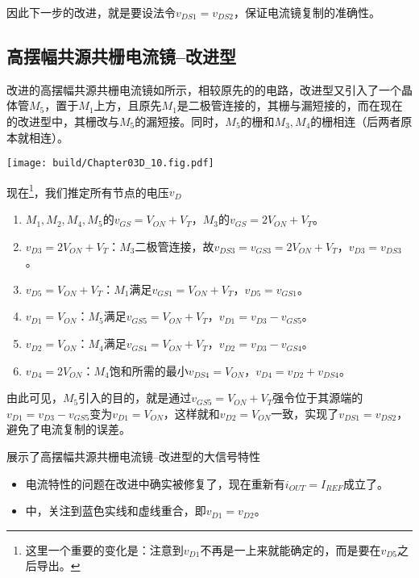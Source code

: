 因此下一步的改进，就是要设法令$v_{DS1}=v_{DS2}$，保证电流镜复制的准确性。\goodbreak

\subsection{高摆幅共源共栅电流镜--改进型}
改进的高摆幅共源共栅电流镜如所示，相较原先的的电路，改进型又引入了一个晶体管$M_5$，置于$M_1$上方，且原先$M_1$是二极管连接的，其栅与漏短接的，而在现在的改进型中，其栅改与$M_5$的漏短接。同时，$M_5$的栅和$M_3,M_4$的栅相连（后两者原本就相连）。\nopagebreak

\begin{Figure}
    \texttt{[image: build/Chapter03D\_10.fig.pdf]}
\end{Figure}

现在\footnote{这里一个重要的变化是：注意到$v_{D1}$不再是一上来就能确定的，而是要在$v_{D5}$之后导出。}，我们推定所有节点的电压$v_D$
\begin{enumerate}
    \item $M_1,M_2,M_4,M_5$的$v_{GS}=V_{ON}+V_T$，$M_3$的$v_{GS}=2V_{ON}+V_T$。
    \item $v_{D3}=2V_{ON}+V_T$：$M_3$二极管连接，故$v_{DS3}=v_{GS3}=2V_{ON}+V_T$，$v_{D3}=v_{DS3}$。
    \item $v_{D5}=V_{ON}+V_T$：$M_1$满足$v_{GS1}=V_{ON}+V_T$，$v_{D5}=v_{GS1}$。
    \item $v_{D1}=V_{ON}$：$M_5$满足$v_{GS5}=V_{ON}+V_T$，$v_{D1}=v_{D3}-v_{GS5}$。
    \item $v_{D2}=V_{ON}$：$M_4$满足$v_{GS4}=V_{ON}+V_T$，$v_{D2}=v_{D3}-v_{GS4}$。
    \item $v_{D4}=2V_{ON}$：$M_4$饱和所需的最小$v_{DS4}=V_{ON}$，$v_{D4}=v_{D2}+v_{DS4}$。
\end{enumerate}

由此可见，$M_5$引入的目的，就是通过$v_{GS5}=V_{ON}+V_T$强令位于其源端的$v_{D1}=v_{D3}-v_{GS5}$变为$v_{D1}=V_{ON}$，这样就和$v_{D2}=V_{ON}$一致，实现了$v_{DS1}=v_{DS2}$，避免了电流复制的误差。\vspace{2.5ex}

展示了高摆幅共源共栅电流镜--改进型的大信号特性
\begin{itemize}
    \item 电流特性的问题在改进中确实被修复了，现在重新有$i_{OUT}=I_{REF}$成立了。
    \item {}中，关注到蓝色实线和虚线重合，即$v_{D1}=v_{D2}$。
\end{itemize}

